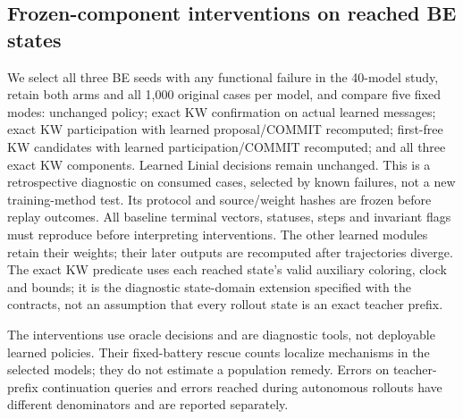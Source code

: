 \subsection{Frozen-component interventions on reached BE states}\label{sec:components}
We select all three BE seeds with any functional failure in the 40-model
study, retain both arms and all 1,000 original cases per model, and compare
five fixed modes: unchanged policy; exact KW confirmation on actual learned
messages; exact KW participation with learned proposal/COMMIT recomputed;
first-free KW candidates with learned participation/COMMIT recomputed; and
all three exact KW components. Learned Linial decisions remain unchanged.
This is a retrospective diagnostic on consumed cases, selected by known
failures, not a new training-method test. Its protocol and source/weight
hashes are frozen before replay outcomes. All baseline terminal vectors,
statuses, steps and invariant flags must reproduce before interpreting
interventions. The other learned modules retain their weights; their later
outputs are recomputed after trajectories diverge.
The exact KW predicate uses each reached state's valid auxiliary coloring,
clock and bounds; it is the diagnostic state-domain extension specified
with the contracts, not an assumption that every rollout state is an exact
teacher prefix.



The interventions use oracle decisions and are diagnostic tools, not deployable
learned policies. Their fixed-battery rescue counts localize mechanisms in
the selected models; they do not estimate a population remedy. Errors on
teacher-prefix continuation queries and errors reached during autonomous
rollouts have different denominators and are reported separately.
